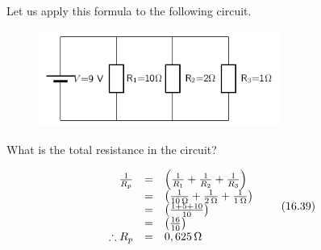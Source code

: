           \label{m38776*id66324}Let us apply this formula to the following circuit.\par 
          \label{m38776*id66328}
    \setcounter{subfigure}{0}
	\begin{figure}[H] %
    \begin{center}
    \label{m38776*id66331!!!underscore!!!media}\label{m38776*id66331!!!underscore!!!printimage}\includegraphics[width=300px]{col11305.imgs/m38776_PG11C9_010.png} %
      \vspace{2pt}
    \vspace{.1in}
    \end{center}
 \end{figure}       
          \par 
          \label{m38776*id663318}What is the total resistance in the circuit?\par 
          \label{m38776*id66342}\nopagebreak\noindent{}
            
    \begin{equation}
    \begin{array}{ccc}\hfill \frac{1}{{R}_{p}}& =& \left(\frac{1}{{R}_{1}}+\frac{1}{{R}_{2}}+\frac{1}{{R}_{3}}\right)\hfill \\ & =& \left(\frac{1}{10\phantom{\rule{0.166667em}{0ex}}\Omega }+\frac{1}{2\phantom{\rule{0.166667em}{0ex}}\Omega }+\frac{1}{1\phantom{\rule{0.166667em}{0ex}}\Omega }\right)\hfill \\ & =& \left(\frac{1+5+10}{10}\right)\hfill \\ & =& \left(\frac{16}{10}\right)\hfill \\ \hfill \therefore {R}_{p}& =& 0,625\phantom{\rule{0.166667em}{0ex}}\Omega \hfill \end{array}\tag{16.39}
      \end{equation}
          \label{m38776*eip-234}
